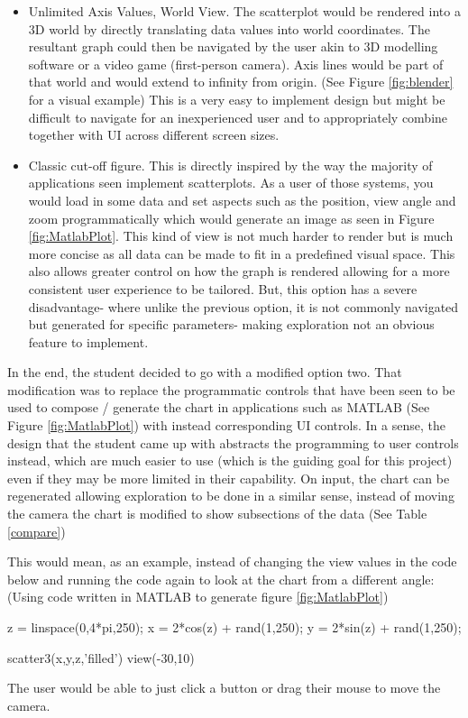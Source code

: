 \begin{itemize}
    \item Unlimited Axis Values, World View. The scatterplot would be rendered into a 3D world by directly translating data values into world coordinates. The resultant graph could then be navigated by the user akin to 3D modelling software or a video game (first-person camera). Axis lines would be part of that world and would extend to infinity from origin. (See Figure \ref{fig:blender} for a visual example) This is a very easy to implement design but might be difficult to navigate for an inexperienced user and to appropriately combine together with UI across different screen sizes.
    \item Classic cut-off figure. This is directly inspired by the way the majority of applications seen implement scatterplots. As a user of those systems, you would load in some data and set aspects such as the position, view angle and zoom programmatically which would generate an image as seen in Figure \ref{fig:MatlabPlot}. This kind of view is not much harder to render but is much more concise as all data can be made to fit in a predefined visual space. This also allows greater control on how the graph is rendered allowing for a more consistent user experience to be tailored. But, this option has a severe disadvantage- where unlike the previous option, it is not commonly navigated but generated for specific parameters- making exploration not an obvious feature to implement.
\end{itemize}

In the end, the student decided to go with a modified option two. That modification was to replace the programmatic controls that have been seen to be used to compose / generate the chart in applications such as MATLAB (See Figure \ref{fig:MatlabPlot}) with instead corresponding UI controls. In a sense, the design that the student came up with abstracts the programming to user controls instead, which are much easier to use (which is the guiding goal for this project) even if they may be more limited in their capability. On input, the chart can be regenerated allowing exploration to be done in a similar sense, instead of moving the camera the chart is modified to show subsections of the data (See Table \ref{compare})

This would mean, as an example, instead of changing the view values in the code below and running the code again to look at the chart from a different angle: (Using code written in MATLAB \cite[]{mathworks_3d} to generate figure \ref{fig:MatlabPlot})
\begin{code}
    z = linspace(0,4*pi,250);
    x = 2*cos(z) + rand(1,250);
    y = 2*sin(z) + rand(1,250);

    scatter3(x,y,z,'filled')
    view(-30,10)
\end{code}
The user would be able to just click a button or drag their mouse to move the camera.


